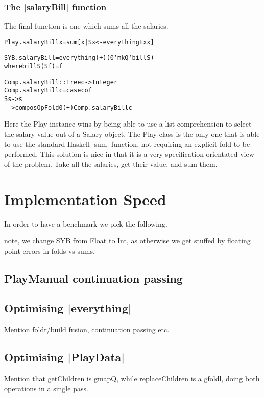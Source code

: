 \documentclass[preprint]{sigplanconf}
\newenvironment{code}{\begin{alltt}\small}{\end{alltt}}
\begin{document}
\subsubsection{The |salaryBill| function}

The final function is one which sums all the salaries.

\begin{code}
Play.salaryBill x = sum [x | S x <- everythingEx x]

SYB.salaryBill = everything (+) (0 `mkQ` billS)
   where billS (S f) = f

Comp.salaryBill :: Tree c -> Integer
Comp.salaryBill c = case c of
    S s -> s
    _ -> composOpFold 0 (+) Comp.salaryBill c
\end{code}

Here the Play instance wins by being able to use a list comprehension to select the salary value out of a Salary object. The Play class is the only one that is able to use the standard Haskell |sum| function, not requiring an explicit fold to be performed. This solution is nice in that it is a very specification orientated view of the problem. Take all the salaries, get their value, and sum them.


\section{Implementation Speed}

In order to have a benchmark we pick the following.

note, we change SYB from Float to Int, as otherwise we get stuffed by floating point errors in folds vs sums.

\subsection{PlayManual continuation passing}


\subsection{Optimising |everything|}

Mention foldr/build fusion, continuation passing etc.

\subsection{Optimising |PlayData|}

Mention that getChildren is gmapQ, while replaceChildren is a gfoldl, doing both operations in a single pass.
\end{document}
